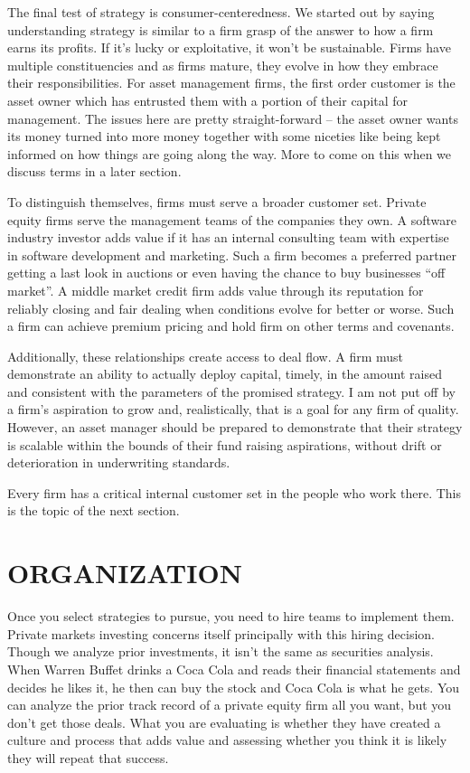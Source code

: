 \documentclass[12pt,english]{article}\usepackage[]{graphicx}\usepackage[]{color}
\begin{document}
The final test of strategy is consumer-centeredness. We started out
by saying understanding strategy is similar to a firm grasp of the
answer to how a firm earns its profits. If it's lucky or exploitative,
it won't be sustainable. Firms have multiple constituencies and as
firms mature, they evolve in how they embrace their responsibilities.
For asset management firms, the first order customer is the asset
owner which has entrusted them with a portion of their capital for
management. The issues here are pretty straight-forward -- the asset
owner wants its money turned into more money together with some niceties
like being kept informed on how things are going along the way. More
to come on this when we discuss terms in a later section. 

To distinguish themselves, firms must serve a broader customer set.
Private equity firms serve the management teams of the companies they
own. A software industry investor adds value if it has an internal
consulting team with expertise in software development and marketing.
Such a firm becomes a preferred partner getting a last look in auctions
or even having the chance to buy businesses ``off market''. A middle
market credit firm adds value through its reputation for reliably
closing and fair dealing when conditions evolve for better or worse.
Such a firm can achieve premium pricing and hold firm on other terms
and covenants. 

Additionally, these relationships create access to deal flow. A firm
must demonstrate an ability to actually deploy capital, timely, in
the amount raised and consistent with the parameters of the promised
strategy. I am not put off by a firm's aspiration to grow and, realistically,
that is a goal for any firm of quality. However, an asset manager
should be prepared to demonstrate that their strategy is scalable
within the bounds of their fund raising aspirations, without drift
or deterioration in underwriting standards. 

Every firm has a critical internal customer set in the people who
work there. This is the topic of the next section.

\section*{ORGANIZATION}

Once you select strategies to pursue, you need to hire teams to implement
them. Private markets investing concerns itself principally with this
hiring decision. Though we analyze prior investments, it isn't the
same as securities analysis. When Warren Buffet drinks a Coca Cola
and reads their financial statements and decides he likes it, he then
can buy the stock and Coca Cola is what he gets. You can analyze the
prior track record of a private equity firm all you want, but you
don't get those deals. What you are evaluating is whether they have
created a culture and process that adds value and assessing whether
you think it is likely they will repeat that success.
\end{document}
